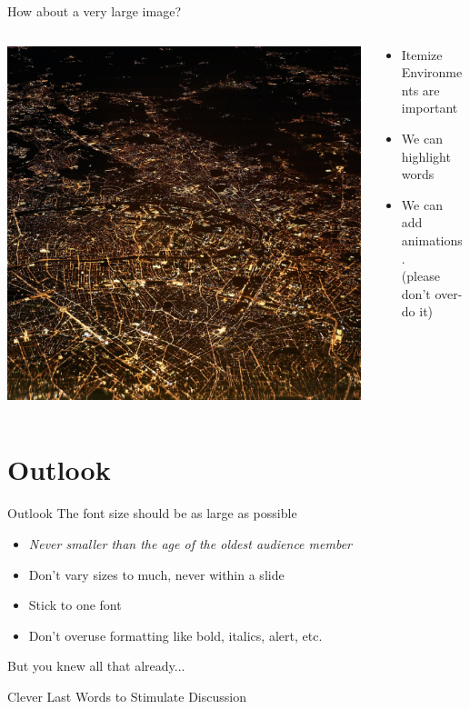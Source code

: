 \documentclass[aspectratio=169,10pt]{beamer}
\begin{document}
\begin{frame}[fragile]{How about a very large image?}

\begin{columns}
    \begin{column}{0.57\paperwidth}
        \vspace{0.5pt}
        \includegraphics[width=\linewidth, clip]{images/city}
    \end{column}
    \begin{column}[c]{0.43\paperwidth}
        \begin{itemize}
        \item Itemize Environments are important
        \item We can \alert{highlight} words
        \pause
        \item We can add animations.\\(please don't over-do it)
        \end{itemize}
    \end{column}
\end{columns}
\end{frame}

\section{Outlook}
\begin{frame}{Outlook}
\Large
The font size should be as large as possible
\begin{itemize}
\item \textit{Never smaller than the age of the oldest audience member}
\item Don't vary sizes to much, never within a slide
\item Stick to one font
\item Don't overuse formatting like bold, italics, alert, etc.
\end{itemize}
But you knew all that already...
\end{frame}

\begin{frame}[t,standout]
\Large
Clever Last Words to Stimulate Discussion
\end{frame}
\end{document}
